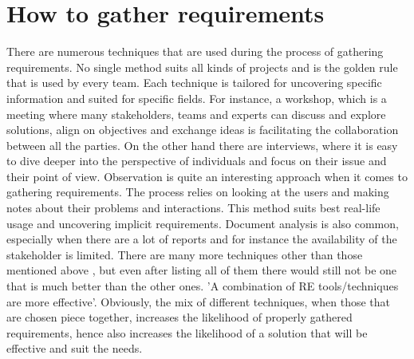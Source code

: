 \section{How to gather requirements}
\par
There are numerous techniques that are used during the process of gathering requirements. No single method suits all kinds of projects and is the golden rule that is used by every team. Each technique is tailored for uncovering specific information and suited for specific fields. For instance, a workshop, which is a meeting where many stakeholders, teams and experts can discuss and explore solutions, align on objectives and exchange ideas is facilitating the collaboration between all the parties. On the other hand there are interviews, where it is easy to dive deeper into the perspective of individuals and focus on their issue and their point of view. Observation is quite an interesting approach when it comes  to gathering requirements. The process relies on looking at the users and making notes about their problems and interactions. This method suits best real-life usage and uncovering implicit requirements. Document analysis is also common, especially when there are a lot of reports and for instance the availability of the stakeholder is limited. There are many more techniques other than those mentioned above \cite{MediumRequirementsAnalysis}, but even after listing all of them there would still not be one that is much better than the other ones. 'A combination of RE tools/techniques are more effective'\cite{CombineMethods}. Obviously, the mix of different techniques, when those that are chosen piece together, increases the likelihood of properly gathered requirements, hence also increases the likelihood of a solution that will be effective and suit the needs.
\par
